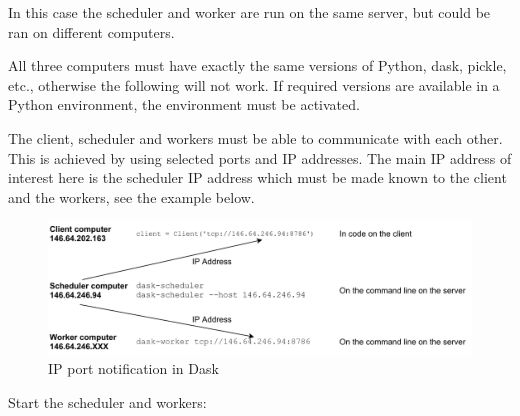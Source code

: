 In this case the scheduler and worker are run on the same server, but could be ran on different computers.


All three computers must have exactly the same versions of Python, dask, pickle, etc., otherwise the following will not work. If required versions are available in a Python environment, the environment must be activated.


The client, scheduler and workers must be able to communicate with each other. This is achieved by using selected ports and IP addresses. The main IP address of interest here is the scheduler IP address which must be made known to the client and the workers, see the example below.

\begin{figure}[htbp]
    \centering
\includegraphics[width=\textwidth]{pic/serverIP}
    \caption{IP port notification in Dask}
    \label{fig:serverIP}
\end{figure}


Start the scheduler and workers:


